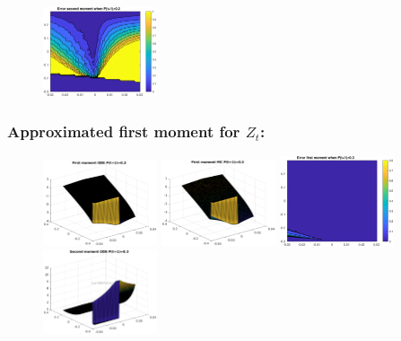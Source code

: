 \documentclass[aspectratio=169]{beamer}\usepackage[utf8]{inputenc}
\begin{document}
\begin{frame}
\begin{figure}[ht!]
\includegraphics[width=0.3\textwidth]{../../MATLAB_Files/Results/moments/lamperti/errors/sm_1.eps}
\end{figure}

\end{frame}


\begin{frame}\frametitle{Approximated first moment for $Z_t$:}

\begin{figure}[ht!]
\centering
\includegraphics[width=0.3\textwidth]{../../MATLAB_Files/Results/moments/lamperti/errors/fm_ODE_2.eps}\quad
\includegraphics[width=0.3\textwidth]{../../MATLAB_Files/Results/moments/lamperti/errors/fm_MC_2.eps}\quad
\includegraphics[width=0.3\textwidth]{../../MATLAB_Files/Results/moments/lamperti/errors/fm_2.eps}\quad
\includegraphics[width=0.3\textwidth]{../../MATLAB_Files/Results/moments/lamperti/errors/sm_ODE_2.eps}\quad

\end{figure}
\end{frame}
\end{document}
